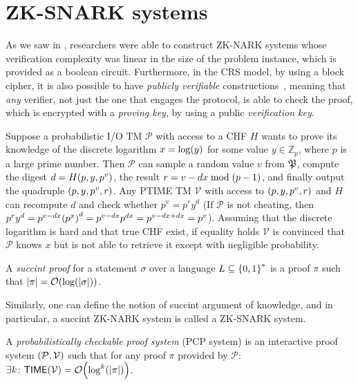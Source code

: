 \section{ZK-SNARK systems}
As we saw in , researchers were able to construct ZK-NARK systems whose 
verification complexity was linear in the size of the problem instance, which is provided as a 
boolean circuit.
Furthermore, in the CRS model, by using a block cipher, it is also possible to have 
\emph{publicly verifiable} constructions~\cite{LapidotS1991}, meaning that \emph{any} verifier, 
not just the one that engages the protocol, is able to check the proof, which is encrypted with a 
\emph{proving key}, by using a public \emph{verification key}.

\begin{proposition}
  Suppose a probabilistic I/O TM \(\mathcal{P}\) with access to a CHF \(H\) wants to prove its 
  knowledge of the discrete logarithm \(x = \call{\log}{y}\) for some value 
  \(y \in \mathbb{Z}_p\), where \(p\) is a large prime number.
  Then \(\mathcal{P}\) can sample a random value \(v\) from \(\Taperand \), compute the digest 
  \(d = \call{H}{p, y, p^v}\), the result \(r = {v - dx} \bmod \Parens*{p - 1}\), and finally 
  output the quadruple \(\Tuple{p, y, p^v, r}\).
  Any \textnormal{\textsc{PTIME}} TM \(\mathcal{V}\) with access to \(\Tuple{p, y, p^v, r}\) 
  and \(H\) can recompute \(d\) and check whether \(p^v = p^{r}y^{d}\)
  (If \(\mathcal{P}\) is not cheating, then \(p^{r}y^{d} = p^{v - dx}\Parens*{p^{x}}^d = 
  p^{v - dx}p^{dx} = p^{v - dx + dx} = p^v\)).
  Assuming that the discrete logarithm is hard and that true CHF exist, if equality holds 
  \(\mathcal{V}\) is convinced that \(\mathcal{P}\) knows \(x\) but is not able to retrieve it 
  except with negligible probability.
\end{proposition}

\begin{definition}
  A \emph{succint proof} for a statement \(\sigma \) over a language \(L \subseteq \Set{0, 1}^*\) 
  is a proof \(\pi \) such that \(\abs{\pi} = \BigO{\call{\log}{\abs{\sigma}}}\).
\end{definition}

Similarly, one can define the notion of succint argument of knowledge, and in particular, a 
succint ZK-NARK system is called a ZK-SNARK system.
\begin{definition}
  A \emph{probabilistically checkable proof system} (PCP system) is an interactive proof system 
  \(\Tuple{\mathcal{P, V}}\) such that for any proof \(\pi \) provided by \(\mathcal{P}\):
  \(\exists k\colon \call{\Time}{\mathcal{V}} = \BigO{\call{\log^k}{\abs{\pi}}}\).
\end{definition}

